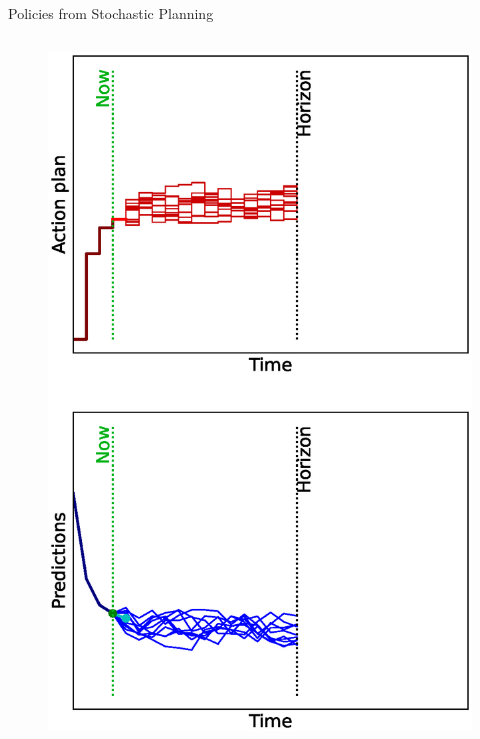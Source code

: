 \documentclass[lecture]{beamer}
\begin{document}
\begin{frame}{\normalsize Policies from Stochastic Planning}
\begin{columns}
\begin{overlayarea}{\textwidth}{0.9\textheight}
\begin{figure}
{          \includegraphics[width=\FS\textwidth,clip]{Codes/MPC/MPCMCWRONG3.eps}
        }%
        {%
}
\end{figure}
\end{overlayarea}
\end{columns}
\end{frame}
\end{document}
